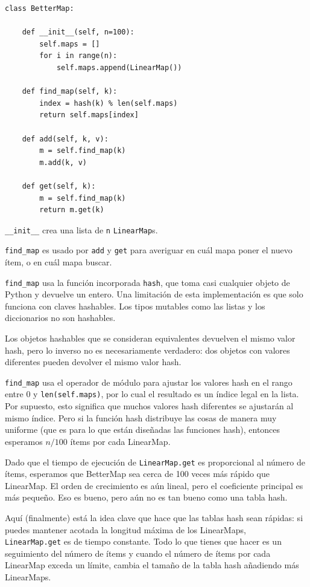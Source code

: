 \documentclass[10pt]{book}
\begin{document}
\begin{verbatim}
class BetterMap:

    def __init__(self, n=100):
        self.maps = []
        for i in range(n):
            self.maps.append(LinearMap())

    def find_map(self, k):
        index = hash(k) % len(self.maps)
        return self.maps[index]

    def add(self, k, v):
        m = self.find_map(k)
        m.add(k, v)

    def get(self, k):
        m = self.find_map(k)
        return m.get(k)
\end{verbatim}

\verb"__init__" crea una lista de {\tt n} {\tt LinearMap}s.

\verb"find_map" es usado por
{\tt add} y {\tt get}
para averiguar en cuál mapa poner el
nuevo ítem, o en cuál mapa buscar.

\verb"find_map" usa la función incorporada {\tt hash}, que toma
casi cualquier objeto de Python y devuelve un entero.  Una limitación de esta
implementación es que solo funciona con claves hashables.  Los tipos
mutables como las listas y los diccionarios no son hashables.

Los objetos hashables que se consideran equivalentes devuelven el mismo valor
hash, pero lo inverso no es necesariamente verdadero: dos objetos con
valores diferentes pueden devolver el mismo valor hash.

\verb"find_map" usa el operador de módulo para ajustar los valores hash
en el rango entre 0 y {\tt len(self.maps)}, por lo cual el resultado es un índice
legal en la lista.  Por supuesto, esto significa que muchos valores
hash diferentes se ajustarán al mismo índice.  Pero si la función hash
distribuye las cosas de manera muy uniforme (que es para lo que están diseñadas
las funciones hash), entonces esperamos $n/100$ ítems por cada LinearMap.

Dado que el tiempo de ejecución de {\tt LinearMap.get} es proporcional al
número de ítems, esperamos que BetterMap sea cerca de 100 veces más rápido
que LinearMap.  El orden de crecimiento es aún lineal, pero el
coeficiente principal es más pequeño.  Eso es bueno, pero aún no es
tan bueno como una tabla hash.

Aquí (finalmente) está la idea clave que hace que las tablas hash sean rápidas: si
puedes mantener acotada la longitud máxima de los LinearMaps, {\tt
  LinearMap.get} es de tiempo constante.  Todo lo que tienes que hacer es un seguimiento
del número de ítems y cuando el número de
ítems por cada LinearMap exceda un límite, cambia el tamaño de la tabla hash
añadiendo más LinearMaps.
\end{document}
